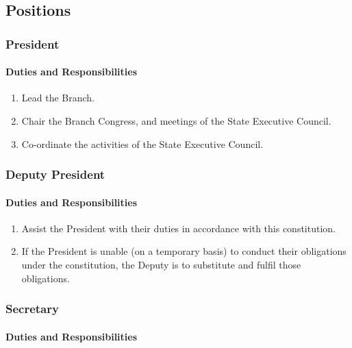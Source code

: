 \documentclass[a4paper,titlepage,8.5pt]{article}
\newcommand{\stateorterritory}{State}
\begin{document}
\subsection{Positions}

\subsubsection{President}

\paragraph{Duties and Responsibilities}

\begin{enumerate}
\item Lead the Branch.
\item Chair the Branch Congress, and meetings of the {\stateorterritory} Executive Council.
\item Co-ordinate the activities of the {\stateorterritory} Executive Council.
\end{enumerate}

\subsubsection{Deputy President}

\paragraph{Duties and Responsibilities}

\begin{enumerate}
\item Assist the President with their duties in accordance with this constitution.
\item If the President is unable (on a temporary basis) to conduct their obligations under the constitution, the Deputy is to substitute and fulfil those obligations.
\end{enumerate}

\subsubsection{Secretary}

\paragraph{Duties and Responsibilities}
\end{document}
